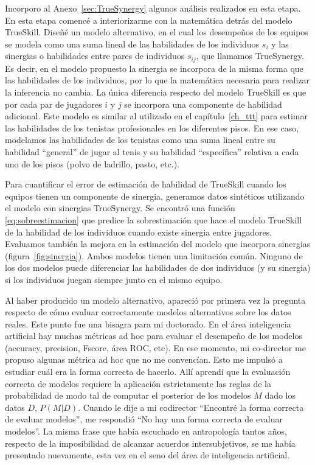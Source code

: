 \documentclass[a4paper,11pt]{book}
\theoremstyle{definition}
\begin{document}

Incorporo al Anexo~\ref{sec:TrueSynergy} algunos an\'alisis realizados en esta etapa.
%
En esta etapa comenc\'e a interiorizarme con la matem\'atica detr\'as del modelo TrueSkill.
%
Dise\~n\'e un modelo alternativo, en el cual los desempe\~nos de los equipos se modela como una suma lineal de las habilidades de los individuos $s_i$ y las sinergias o habilidades entre pares de individuos $s_{ij}$, que llamamos TrueSynergy.
%
Es decir, en el modelo propuesto la sinergia se incorpora de la misma forma que las habilidades de los individuos, por lo que la matem\'atica necesaria para realizar la inferencia no cambia.
%
La \'unica diferencia respecto del modelo TrueSkill es que por cada par de jugadores $i$ y $j$ se incorpora una componente de habilidad adicional.
%
Este modelo es similar al utilizado en el cap\'itulo~\ref{ch_ttt} para estimar las habilidades de los tenistas profesionales en los diferentes pisos.
%
En ese caso, modelamos las habilidades de los tenistas como una suma lineal entre su habilidad ``general'' de jugar al tenis y su habilidad ``espec\'ifica'' relativa a cada uno de los pisos (polvo de ladrillo, pasto, etc.).


Para cuantificar el error de estimaci\'on de habilidad de TrueSkill cuando los equipos tienen un componente de sinergia, generamos datos sint\'eticos utilizando el modelo con sinergias TrueSynergy.
%
Se encontr\'o una funci\'on \eqref{eq:sobreestimacion} que predice la sobrestimaci\'on que hace el modelo TrueSkill de la habilidad de los individuos cuando existe sinergia entre jugadores.
%
Evaluamos tambi\'en la mejora en la estimaci\'on del modelo que incorpora sinergias (figura~\ref{fig:sinergia}).
%
Ambos modelos tienen una limitaci\'on com\'un.
%
Ninguno de los dos modelos puede diferenciar las habilidades de dos individuos (y su sinergia) si los individuos juegan siempre junto en el mismo equipo.


Al haber producido un modelo alternativo, apareci\'o por primera vez la pregunta respecto de c\'omo evaluar correctamente modelos alternativos sobre los datos reales.
%
Este punto fue una bisagra para mi doctorado.
%
En el \'area inteligencia artificial hay muchas m\'etricas ad hoc para evaluar el desempe\~no de los modelos (accuracy, precision, Fscore, \'area ROC, etc).
%
En ese momento, mi co-director me propuso algunas m\'etrica ad hoc que no me convenc\'ian.
%
Esto me impuls\'o a estudiar cu\'al era la forma correcta de hacerlo.
%
All\'i aprend\'i que la evaluaci\'on correcta de modelos requiere la aplicaci\'on estrictamente las reglas de la probabilidad de modo tal de computar el posterior de los modelos $M$ dado los datos $D$, $P(M|D)$.
%
Cuando le dije a mi codirector ``Encontr\'e la forma correcta de evaluar modelos'', me respondi\'o ``No hay una forma correcta de evaluar modelos''.
%
La misma frase que hab\'ia escuchado en antropolog\'ia tantos a\~nos, respecto de la imposibilidad de alcanzar acuerdos intersubjetivos, se me hab\'ia presentado nuevamente, esta vez en el seno del \'area de inteligencia artificial.
\end{document}
